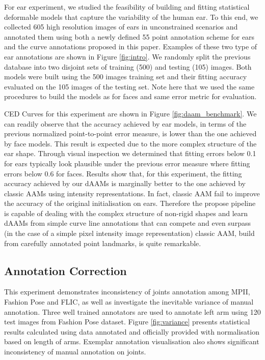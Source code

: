 For ear experiment, we studied the feasibility of building and fitting statistical deformable models that capture the variability of the human ear. To this end, we collected 605 high resolution images of ears in unconstrained scenarios and annotated them using both a newly defined 55 point annotation scheme for ears and the curve annotations proposed in this paper. Examples of these two type of ear annotations are shown in Figure \ref{fig:intro}. We randomly split the previous database into two disjoint sets of training (500) and testing (105) images. Both models were built using the 500 images training set and their fitting accuracy evaluated on the 105 images of the testing set. Note here that we used the same procedures to build the models as for faces and same error metric for evaluation.

CED Curves for this experiment are shown in Figure \ref{fig:daam_benchmark}. We can readily observe that the accuracy achieved by ear models, in terms of the previous normalized point-to-point error measure, is lower than the one achieved by face models. This result is expected due to the more complex structure of the ear shape. Through visual inspection we determined that fitting errors below 0.1 for ears typically look plausible under the previous error measure where fitting errors below 0.6 for faces. Results show that, for this experiment, the fitting accuracy achieved by our dAAMs is marginally better to the one achieved by classic AAMs using intensity representations. In fact, classic AAM fail to improve the accuracy of the original initialisation on ears. Therefore the propose pipeline is capable of dealing with the complex structure of non-rigid shapes and learn dAAMs from simple curve line annotations that can compete and even surpass (in the case of a simple pixel intensity image representation) classic AAM, build from carefully annotated point landmarks, is quite remarkable.

\subsection{Annotation Correction}
\label{exp:qualitative}

This experiment demonstrates inconsistency of joints annotation among MPII, Fashion Pose and FLIC, as well as investigate the inevitable variance of manual annotation. Three well trained annotators are used to annotate left arm using 120 test images from Fashion Pose dataset. Figure \ref{fig:variance} presents statistical results calculated using data annotated and officially provided with normalisation based on length of arms. Exemplar annotation visualisation also shows significant inconsistency of manual annotation on joints.

